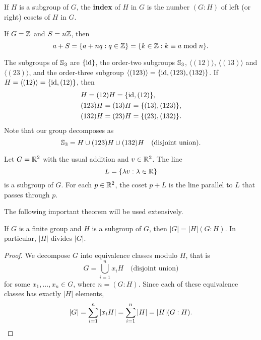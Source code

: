\begin{definition}
    If $H$ is a subgroup of $G$, the \textbf{index} of $H$ in $G$
    is the number $(G:H)$ of left (or right) cosets of $H$ in $G$. 
\end{definition}

\begin{example}
    If $G=\mathbb{Z}$ and $S=n\mathbb{Z}$, then 
    \[
    a+S=\{a+nq:q\in\mathbb{Z}\}=\{k\in\mathbb{Z}:k\equiv a\bmod n\}.
    \]
\end{example}
    
\begin{example}
    The subgroups of $\mathbb{S}_3$ are $\{\operatorname{id}\}$, the order-two subgroups 
    $\mathbb{S}_3$, $\langle(12)\rangle$, 
    $\langle(13)\rangle$ and $\langle(23)\rangle$, and 
    the order-three subgroup $\langle(123)\rangle=\{\operatorname{id},(123),(132)\}$.  
    If $H=\langle(12)\rangle=\{\operatorname{id},(12)\}$, then 
    \begin{align*}
    &H=(12)H=\{\operatorname{id},(12)\},\\
    &(123)H=(13)H=\{(13),(123)\},\\
    &(132)H=(23)H=\{(23),(132)\}.
    \end{align*}
    Note that our group decomposes as 
    \[
    \mathbb{S}_3=H\cup (123)H\cup (132)H\quad\text{(disjoint union)}.
    \]
    \end{example}

    \begin{example}
        Let $G=\mathbb{R}^2$ with the usual addition 
        and $v\in\mathbb{R}^2$. The line 
        \[
        L=\{\lambda v:\lambda\in\mathbb{R}\}
        \]
        is a subgroup of $G$. For each 
        $p\in\mathbb{R}^2$, the coset $p+L$ 
        is the line parallel to $L$ that 
        passes through $p$.
    \end{example}

The following important theorem will be used extensively. 

\begin{theorem}[Lagrange]
    If $G$ is a finite group and $H$ is a subgroup of $G$, 
    then $|G|=|H|(G:H)$. In particular, $|H|$ divides $|G|$.
\end{theorem}

\begin{proof}
    We decompose $G$ into equivalence classes modulo $H$, that is 
    \[
    G=\bigcup_{i=1}^n x_iH\quad\text{(disjoint union)}
    \]
    for some $x_1,\dots,x_n\in G$, where $n=(G:H)$. 
    Since each of these equivalence classes has 
    exactly 
    $|H|$ elements,
    \[
            |G|=\sum_{i=1}^n|x_iH|=\sum_{i=1}^n|H|=|H|(G:H).\qedhere
    \]
\end{proof}

